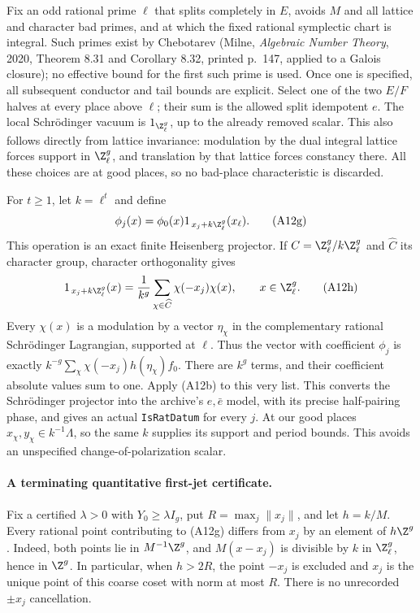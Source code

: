 Fix an odd rational prime $\ell$ that splits completely in
$E$, avoids $M$ and all lattice and character bad primes,
and at which the fixed rational symplectic chart is integral.
Such primes exist by Chebotarev (Milne, \emph{Algebraic
Number Theory}, 2020, Theorem 8.31 and Corollary 8.32,
printed p.~147, applied to a Galois closure); no effective bound for the
first such prime is used.  Once one is specified, all
subsequent conductor and tail bounds are explicit.  Select
one of the two $E/F$ halves at every place above $\ell$;
their sum is the allowed split idempotent $e$.  The local
Schr\"odinger vacuum is $1_{\Z_\ell^g}$, up to the already
removed scalar.  This also follows directly from lattice
invariance: modulation by the dual integral lattice forces
support in $\Z_\ell^g$, and translation by that lattice
forces constancy there.  All these choices are at good
places, so no bad-place characteristic is discarded.

For $t\geq1$, let $k=\ell^t$ and define
\[
 \phi_j(x)=\phi_0(x)
           1_{\,x_j+k\Z_\ell^g}(x_\ell).
 \tag{A12g}
\]
This operation is an exact finite Heisenberg projector.
If $C=\Z_\ell^g/k\Z_\ell^g$ and $\widehat C$ its
character group, character orthogonality gives
\[
 1_{\,x_j+k\Z_\ell^g}(x)
       =\frac1{k^g}\sum_{\chi\in\widehat C}
                         \chi(-x_j)\chi(x),
                         \qquad x\in\Z_\ell^g.
 \tag{A12h}
\]
Every $\chi(x)$ is a modulation by a vector $\eta_\chi$
in the complementary rational Schr\"odinger Lagrangian,
supported at $\ell$.  Thus the vector with coefficient
$\phi_j$ is exactly
$k^{-g}\sum_\chi\chi(-x_j)h(\eta_\chi)f_0$.
There are $k^g$ terms, and their coefficient absolute
values sum to one.  Apply (A12b) to this very list.
This converts the Schr\"odinger projector into the
archive's $e,\bar e$ model, with its precise half-pairing
phase, and gives an actual \texttt{IsRatDatum} for every
$j$.  At our good places $x_\chi,y_\chi\in k^{-1}\Lambda$,
so the same $k$ supplies its support and period bounds.
This avoids an unspecified change-of-polarization scalar.

\paragraph{A terminating quantitative first-jet certificate.}
Fix a certified $\lambda>0$ with $Y_0\geq\lambda I_g$,
put $R=\max_j\|x_j\|$, and let $h=k/M$.
Every rational point contributing to (A12g) differs from
$x_j$ by an element of $h\Z^g$.  Indeed, both points
lie in $M^{-1}\Z^g$, and $M(x-x_j)$ is divisible by
$k$ in $\Z_\ell^g$, hence in $\Z^g$.  In particular,
when $h>2R$, the point $-x_j$ is excluded and $x_j$
is the unique point of this coarse coset with norm at
most $R$.  There is no unrecorded $\pm x_j$ cancellation.

